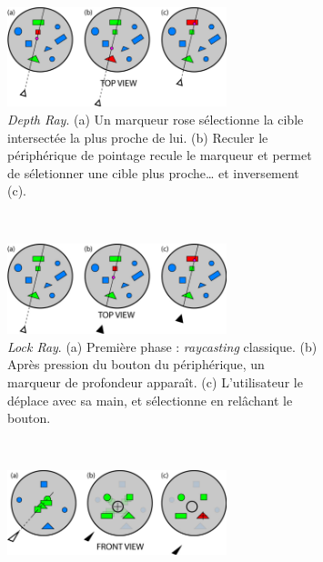 	\newcommand{\rayWidth}{0.48\textwidth}
	\newcommand{\rayImgWidth}{0.7\textwidth}
	\begin{figure}[htbp]
		\begin{subfigure}[t]{\rayWidth}
			\centering
			\includegraphics[width=\rayImgWidth]{figures/ch2/depthRay}
			\caption{\emph{Depth Ray}. (a) Un marqueur rose sélectionne la cible intersectée la plus proche de lui. (b) Reculer le périphérique de pointage recule le marqueur et permet de séletionner une cible plus proche\ldots{} et inversement (c).}
			\label{fig:depthRay}
		\end{subfigure}
		~
		\begin{subfigure}[t]{\rayWidth}
			\centering
			\includegraphics[width=\rayImgWidth]{figures/ch2/lockRay}
			\caption{\emph{Lock Ray}. (a) Première phase : \emph{raycasting} classique. (b) Après pression du bouton du périphérique, un marqueur de profondeur apparaît. (c) L'utilisateur le déplace avec sa main, et sélectionne en relâchant le bouton.}
			\label{fig:lockRay}
		\end{subfigure}
		~
		\begin{subfigure}[t]{\rayWidth}
			\centering
			\includegraphics[width=\rayImgWidth]{figures/ch2/flowerRay}

\end{subfigure}
\end{figure}
